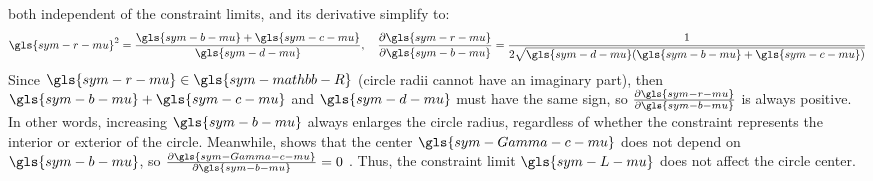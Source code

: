\documentclass[a4paper,fleqn,colorlinks,unicode,lineno]{cas-dc} %
\begin{document}
both independent of the constraint limits,  and its derivative simplify to:
\begin{equation}\label{eq:radius-simplified}
    \gls{sym-r-mu} ^2 = \frac{\gls{sym-b-mu} + \gls{sym-c-mu}}{\gls{sym-d-mu}}
 , \quad
    \frac{\partial \gls{sym-r-mu}}{\partial \gls{sym-b-mu}}  = \frac{1}{2\sqrt{\gls{sym-d-mu} (\gls{sym-b-mu} + \gls{sym-c-mu})}}
 \end{equation}
Since $\gls{sym-r-mu}\in\gls{sym-mathbb-R}$  (circle radii cannot have an imaginary part), then $\gls{sym-b-mu} + \gls{sym-c-mu}$ and $\gls{sym-d-mu}$  must have the same sign, so $\frac{\partial \gls{sym-r-mu}}{\partial \gls{sym-b-mu}}$  is always positive.
In other words, increasing $\gls{sym-b-mu}$  always enlarges the circle radius, regardless of whether the constraint represents the interior or exterior of the circle.
Meanwhile,  shows that the center $\gls{sym-Gamma-c-mu}$  does not depend on $\gls{sym-b-mu}$, so $\frac{\partial \gls{sym-Gamma-c-mu}}{\partial \gls{sym-b-mu}}=0$ .
Thus, the constraint limit $\gls{sym-L-mu}$  does not affect the circle center.
\end{document}
